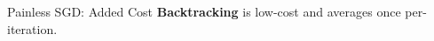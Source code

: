 \documentclass[notheorems]{beamer}
\begin{document}
    \begin{frame}{Painless SGD: Added Cost}
        \textbf{Backtracking} is low-cost and averages once per-iteration.
        \begin{figure}
        \end{figure}

    \end{frame}
\end{document}
